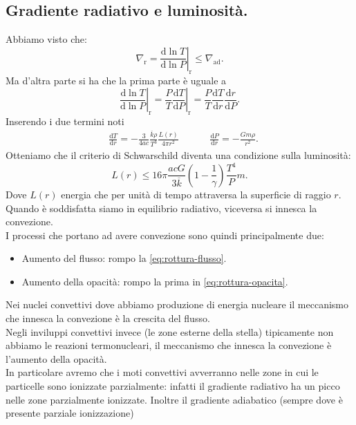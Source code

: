 \subsection{Gradiente radiativo e luminosità.}
\label{subsec:Gradiente radiativo in funzione della luminosità.}
Abbiamo visto che:
\[
	\nabla_\text{r} = \left.\frac{\mbox{d} \ln T}{\mbox{d} \ln P} \right|_{\text{r}}
		\le \nabla_\text{ad} 
.\] 
Ma d'altra parte si ha che la prima parte è uguale a 
\[
	\left.\frac{\mbox{d} \ln T}{\mbox{d} \ln P} \right|_{\text{r}} =
	\left.\frac{P}{T} \frac{\mbox{d} T}{\mbox{d} P} \right|_{\text{r}} =
	\frac{P}{T}
	\frac{\mbox{d} T}{\mbox{d} r} 
	\frac{\mbox{d} r}{\mbox{d} P} 
.\] 
Inserendo i due termini noti
\[\begin{aligned}
	&\frac{\mbox{d} T}{\mbox{d} r} =
	-\frac{3}{4ac}\frac{\overline{k}\rho }{T^3}\frac{L(r)}{4\pi r^2}&
									&&
	&\frac{\mbox{d} P}{\mbox{d} r} = - \frac{Gm\rho }{r^2}
	\label{eq:rottura-opacita}
.\end{aligned}\]
Otteniamo che il criterio di Schwarschild diventa una condizione sulla luminosità:
\[
	L(r) \le 
	16\pi \frac{acG}{3 \overline{k}}\left( 1-\frac{1}{\gamma} \right) \frac{T^4}{P}m
	\label{eq:rottura-flusso}
.\] 
Dove $L(r)$ energia che per unità di tempo attraversa la superficie di raggio $r$. Quando è soddisfatta siamo in equilibrio radiativo, viceversa si innesca la convezione. \\
I processi che portano ad avere convezione sono quindi principalmente due:
\begin{itemize}
	\item Aumento del flusso: rompo la \ref{eq:rottura-flusso}. 
	\item Aumento della opacità: rompo la prima in \ref{eq:rottura-opacita}.
\end{itemize}
Nei nuclei convettivi dove abbiamo produzione di energia nucleare il meccanismo che innesca la convezione è la crescita del flusso. \\
Negli inviluppi convettivi invece (le zone esterne della stella) tipicamente non abbiamo le reazioni termonucleari, il meccanismo che innesca la convezione è l'aumento della opacità.\\
In particolare avremo che i moti convettivi avverranno nelle zone in cui le particelle sono ionizzate parzialmente: infatti il gradiente radiativo ha un picco nelle zone parzialmente ionizzate. Inoltre il gradiente adiabatico (sempre dove è presente parziale ionizzazione) 
